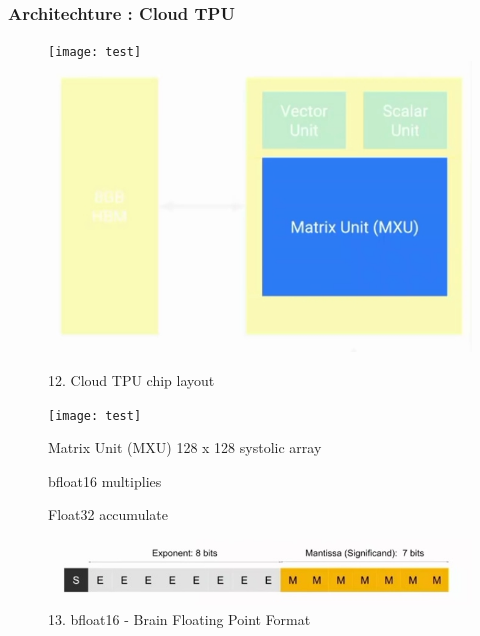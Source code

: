 \documentclass[c]{beamer}
\begin{document}
  \begin{frame} [c]
  \frametitle{Architechture : Cloud TPU}
			\begin{figure}[ht]
 {\begin{minipage}{170pt}
    \texttt{[image: test]}
    	\includegraphics[scale=.34]{images/12chiplayoutcore.png}
            \caption
            {12. Cloud TPU chip layout}
            \label{fig: cloud TPU chip layout core}		
  \end{minipage}}
  {\begin{minipage}[b]{130pt}
    \texttt{[image: test]}
    
    \begin{itemize}
		\justifying
		{\small \item Matrix Unit (MXU)
128 x 128 systolic array
  \item bfloat16 multiplies
\item Float32 accumulate	}
		\end{itemize}
  \end{minipage}}
  \linebreak
  \linebreak
  \linebreak
  	\includegraphics[scale=.5]{images/13chiplayout.png}
            \caption
            {13. bfloat16 - Brain Floating Point Format}
            \label{fig: bfloat16}
\end{figure}
  \end{frame}
 
\end{document}
